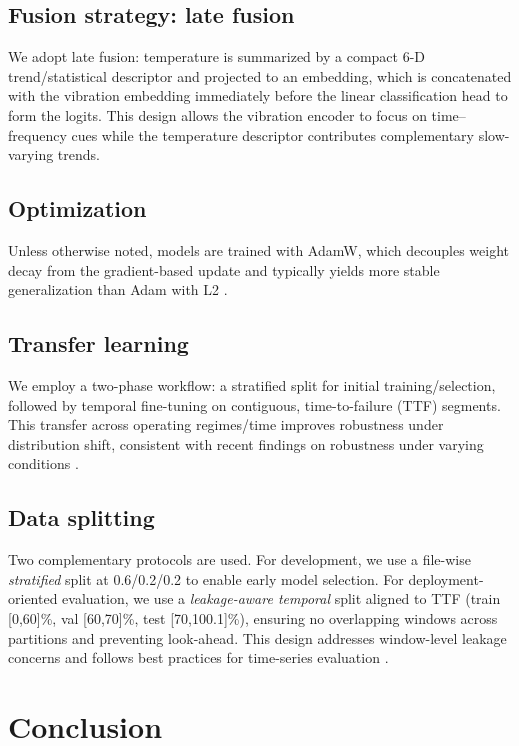 \documentclass[pdflatex,sn-mathphys-num]{sn-jnl}%
\begin{document}
\subsection{Fusion strategy: late fusion}
We adopt late fusion: temperature is summarized by a compact 6-D trend/statistical descriptor and projected to an embedding, which is concatenated with the vibration embedding immediately before the linear classification head to form the logits. This design allows the vibration encoder to focus on time--frequency cues while the temperature descriptor contributes complementary slow-varying trends.

\subsection{Optimization}
Unless otherwise noted, models are trained with AdamW, which decouples weight decay from the gradient-based update and typically yields more stable generalization than Adam with L2 \cite{loshchilov2019adamw}.

\subsection{Transfer learning}
We employ a two-phase workflow: a stratified split for initial training/selection, followed by temporal fine-tuning on contiguous, time-to-failure (TTF) segments. This transfer across operating regimes/time improves robustness under distribution shift, consistent with recent findings on robustness under varying conditions \cite{gao2024inffus_multisource}.

\subsection{Data splitting}
Two complementary protocols are used. For development, we use a file-wise \emph{stratified} split at 0.6/0.2/0.2 to enable early model selection. For deployment-oriented evaluation, we use a \emph{leakage-aware temporal} split aligned to TTF (train [0,60]\%, val [60,70]\%, test [70,100.1]\%), ensuring no overlapping windows across partitions and preventing look-ahead. This design addresses window-level leakage concerns \cite{kaufman2012leakage} and follows best practices for time-series evaluation \cite{bergmeir2012timeseriescv}.

\section{Conclusion}
\label{sec:conclusion}
\end{document}
